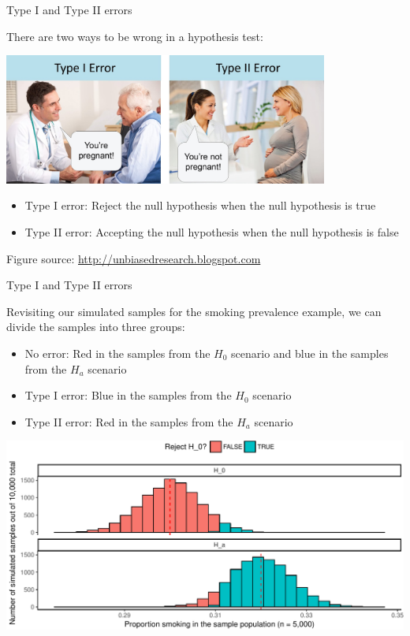 \documentclass[ignorenonframetext,]{beamer}
\providecommand{\tightlist}{%
  \setlength{\itemsep}{0pt}\setlength{\parskip}{0pt}}
\begin{document}
\begin{frame}{Type I and Type II errors}

There are two ways to be wrong in a hypothesis test:

\begin{center}\includegraphics[width=0.8\textwidth]{images/error_types} \end{center}

\begin{itemize}
\tightlist
\item
  Type I error: Reject the null hypothesis when the null hypothesis is
  true
\item
  Type II error: Accepting the null hypothesis when the null hypothesis
  is false
\end{itemize}

\footnotesize{Figure source: \url{http://unbiasedresearch.blogspot.com}}

\end{frame}

\begin{frame}{Type I and Type II errors}

Revisiting our simulated samples for the smoking prevalence example, we
can divide the samples into three groups:

\begin{itemize}
\tightlist
\item
  No error: Red in the samples from the \(H_0\) scenario and blue in the
  samples from the \(H_a\) scenario
\item
  Type I error: Blue in the samples from the \(H_0\) scenario
\item
  Type II error: Red in the samples from the \(H_a\) scenario
\end{itemize}

\begin{center}\includegraphics[height=0.5\textheight]{sample_size_files/figure-beamer/unnamed-chunk-8-1} \end{center}

\end{frame}
\end{document}
